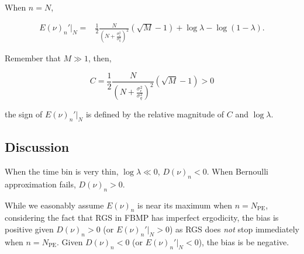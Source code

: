 When $n=N$,

\begin{equation}
\begin{aligned}
    E(\nu)_n'|_N =& \frac{1}{2}\frac{N}{\left(N+\frac{\sigma_\epsilon^2}{\sigma_q^2}\right)^2}(\sqrt{M}-1) + \log\lambda - \log(1-\lambda).
\end{aligned}
\end{equation}

Remember that $M \gg 1$, then,

\begin{equation}
    C = \frac{1}{2}\frac{N}{\left(N+\frac{\sigma_\epsilon^2}{\sigma_q^2}\right)^2}(\sqrt{M}-1) > 0
\end{equation}

the sign of $E(\nu)_n'|_N$ is defined by the relative magnitude of $C$ and $\log\lambda$. 

\subsection{Discussion}

When the time bin is very thin, $\log\lambda \ll 0$, $D(\nu)_n < 0$. When Bernoulli approximation fails, $D(\nu)_n > 0$. 

While we easonably assume $E(\nu)_n$ is near its maximum when $n=N_\mathrm{PE}$, considering the fact that RGS in FBMP has imperfect ergodicity, the bias is positive given $D(\nu)_n > 0$ (or $E(\nu)_n'|_N > 0$) as RGS does \emph{not} stop immediately when $n=N_\mathrm{PE}$. Given $D(\nu)_n < 0$ (or $E(\nu)_n'|_N < 0$), the bias is be negative. 
